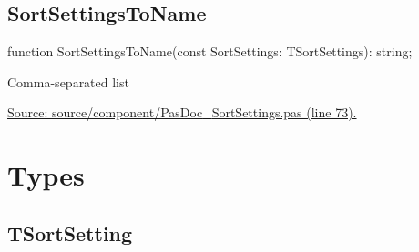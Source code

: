 \documentclass{report}
\newif\ifpdf
\begin{document}
\subsection*{SortSettingsToName}
\fi
\label{PasDoc_SortSettings-SortSettingsToName}
\begin{list}{}{
\setlength{\itemindent}{0cm}
\setlength{\listparindent}{0cm}
\setlength{\leftmargin}{\evensidemargin}
\addtolength{\leftmargin}{\tmplength}
\settowidth{\labelsep}{X}
\addtolength{\leftmargin}{\labelsep}
\setlength{\labelwidth}{\tmplength}
}
\item[\textbf{Declaration}\hfill]
\ifpdf
\begin{flushleft}
\fi
\begin{ttfamily}
function SortSettingsToName(const SortSettings: TSortSettings): string;\end{ttfamily}

\ifpdf
\end{flushleft}
\fi

\par
\item[\textbf{Description}]
Comma{-}separated list\par
\href{https://github.com/pasdoc/pasdoc/blob/master/source/component/PasDoc_SortSettings.pas#L73}{Source: source/component/PasDoc{\_}SortSettings.pas (line 73).}

\end{list}
\section{Types}
\ifpdf
\subsection*{\large{\textbf{TSortSetting}}\normalsize\hspace{1ex}\hrulefill}
\else
\end{document}
